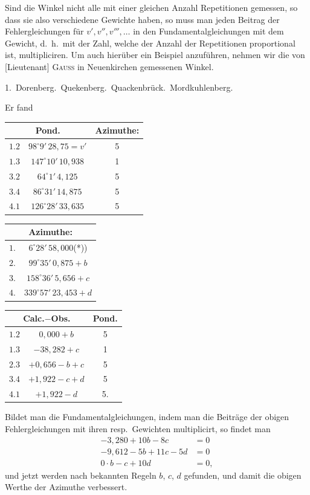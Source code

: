 \documentclass[12pt,a4paper]{article}
\theoremstyle{plain}
\theoremstyle{definition}
\theoremstyle{remark}
\begin{document}
Sind die Winkel nicht alle mit einer gleichen Anzahl Repetitionen gemessen, so dass sie also verschiedene Gewichte haben, so muss man jeden Beitrag der Fehlergleichungen f\"ur $v', v'', v''', \ldots$ in den Fundamentalgleichungen mit dem Gewicht, d.\ h.\ mit der Zahl, welche der Anzahl der Repetitionen proportional ist, multipliciren. Um auch hier\"uber ein Beispiel anzuf\"uhren, nehmen wir die von [Lieutenant] \textsc{Gauss} in Neuenkirchen gemessenen Winkel.
\begin{center}
1.\ Dorenberg.\ Quekenberg.\ Quackenbr\"uck.\ Mordkuhlenberg.
\end{center}
Er fand
\begin{center}
\begin{tabular}{c|c|c}
\multicolumn{2}{c}{Pond.} & Azimuthe:\\[-2pt]
\hline
$1.2$ & $98^{\circ}9'\,28{,}75 = v'$ & 5\\
$1.3$ & $147^{\circ}10'\,10{,}938$ & 1\\
$3.2$ & $64^{\circ}1'\,4{,}125$ & 5\\
$3.4$ & $86^{\circ}31'\,14{,}875$ & 5\\
$4.1$ & $126^{\circ}28'\,33{,}635$ & 5
\end{tabular}
\qquad
\begin{tabular}{c|c}
\multicolumn{2}{c}{Azimuthe:}\\[-2pt]
\hline
$1.$ & $6^{\circ}28'\,58{,}000$\quad(*))\\
$2.$ & $99^{\circ}35'\,0{,}875 + b$\\
$3.$ & $158^{\circ}36'\,5{,}656 + c$\\
$4.$ & $339^{\circ}57'\,23{,}453 + d$
\end{tabular}
\end{center}
\begin{center}
\begin{tabular}{c|c|c}
\multicolumn{2}{c}{Calc.$-$Obs.} & Pond.\\
\hline
$1.2$ & $0{,}000 + b$ & 5\\
$1.3$ & $-38{,}282 + c$ & 1\\
$2.3$ & $+0{,}656 - b + c$ & 5\\
$3.4$ & $+1{,}922 - c + d$ & 5\\
$4.1$ & $+1{,}922 - d$ & 5.
\end{tabular}
\end{center}

Bildet man die Fundamentalgleichungen, indem man die Beitr\"age der obigen Fehlergleichungen mit ihren resp.\ Gewichten multiplicirt, so findet man
\begin{align*}
-3{,}280 + 10b - 8c &= 0\\
-9{,}612 - 5b + 11c - 5d &= 0\\
0 \cdot b - c + 10d &= 0,
\end{align*}
und jetzt werden nach bekannten Regeln $b$, $c$, $d$ gefunden, und damit die obigen Werthe der Azimuthe verbessert.
\end{document}

